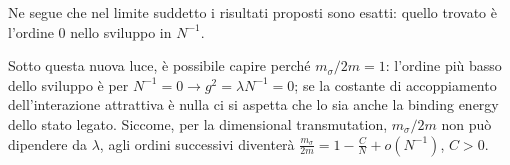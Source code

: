 \documentclass[a4paper,11pt]{amsart}
\newcommand{\nl}{\vskip 0.3cm}
\newcommand{\np}{\vskip 1.3cm}
\newcommand{\HRule}{\center{\rule{0.9\linewidth}{0.5mm}}}
\begin{document}
Ne segue che nel limite suddetto i risultati proposti sono esatti: quello trovato è l'ordine 0 nello sviluppo in $N^{-1}$.\nl

Sotto questa nuova luce, è possibile capire perché $m_{\sigma}/2m = 1$: l'ordine più basso dello sviluppo è per $N^{-1}=0\rightarrow g^2 = \lambda N^{-1} = 0$; se la costante di accoppiamento dell'interazione attrattiva è nulla 
ci si aspetta che lo sia anche la binding energy dello stato legato. Siccome, per la dimensional transmutation, $m_{\sigma}/2m$ non può dipendere da $\lambda$, agli ordini successivi diventerà $\displaystyle\frac{m_{\sigma}}{2m} = 1- \frac{C}{N} + o(N^{-1})$, $C>0$.
\np
\HRule

{}

\end{document}
